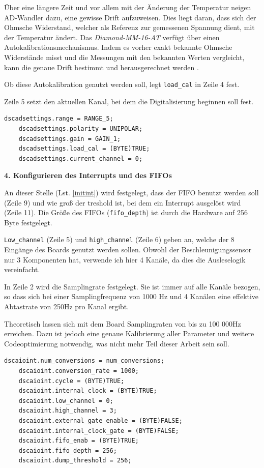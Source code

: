 \documentclass[12pt,a4paper,twoside,BCOR=12.5mm]{scrartcl}
\begin{document}
Über eine längere Zeit und vor allem mit der Änderung der Temperatur neigen AD-Wandler dazu, eine gewisse Drift aufzuweisen. Dies liegt daran, dass sich der Ohmsche Widerstand, welcher als Referenz zur gemessenen Spannung dient, mit der Temperatur ändert. Das \textit{Diamond-MM-16-AT} verfügt über einen Autokalibrationsmechanismus. Indem es vorher exakt bekannte Ohmsche Widerstände misst und die Messungen mit den bekannten Werten vergleicht, kann die genaue Drift bestimmt und herausgerechnet werden \citep[siehe auch][]{Miller:2006fk}.

Ob diese Autokalibration genutzt werden soll, legt \texttt{load\_cal} in Zeile 4 fest.

Zeile 5 setzt den aktuellen Kanal, bei dem die Digitalisierung beginnen soll fest.

\begin{lstlisting}[frame=trBL]
	dscadsettings.range = RANGE_5;
	dscadsettings.polarity = UNIPOLAR;
	dscadsettings.gain = GAIN_1;
	dscadsettings.load_cal = (BYTE)TRUE;
	dscadsettings.current_channel = 0;
\end{lstlisting}


\textbf{4. Konfigurieren des Interrupts und des FIFOs}

An dieser Stelle (Lst. \ref{initint}) wird festgelegt, dass der FIFO benutzt werden soll (Zeile 9) und wie groß der treshold ist, bei dem ein Interrupt ausgelöst wird (Zeile 11). Die Größe des FIFOs (\texttt{fifo\_depth}) ist durch die Hardware auf 256 Byte festgelegt.

\texttt{Low\_channel} (Zeile 5) und \texttt{high\_channel} (Zeile 6) geben an, welche der 8 Eingänge des Boards genutzt werden sollen. Obwohl der Beschleunigungssensor nur 3 Komponenten hat, verwende ich hier 4 Kanäle, da dies die Ausleselogik vereinfacht.

In Zeile 2 wird die Samplingrate festgelegt. Sie ist immer auf alle Kanäle bezogen, so dass sich bei einer Samplingfrequenz von 1000 Hz und 4 Kanälen eine effektive Abtastrate von 250Hz pro Kanal ergibt. 

Theoretisch lassen sich mit dem Board Samplingraten von bis zu 100 000Hz erreichen. Dazu ist jedoch eine genaue Kalibrierung aller Parameter und weitere Codeoptimierung notwendig, was nicht mehr Teil dieser Arbeit sein soll. \\


\begin{lstlisting}[frame=trBL]
	dscaioint.num_conversions = num_conversions;
	dscaioint.conversion_rate = 1000;
	dscaioint.cycle = (BYTE)TRUE;
	dscaioint.internal_clock = (BYTE)TRUE;
	dscaioint.low_channel = 0;
	dscaioint.high_channel = 3;
	dscaioint.external_gate_enable = (BYTE)FALSE;
	dscaioint.internal_clock_gate = (BYTE)FALSE;
	dscaioint.fifo_enab = (BYTE)TRUE;
	dscaioint.fifo_depth = 256;
	dscaioint.dump_threshold = 256;
\end{lstlisting}
\end{document}
